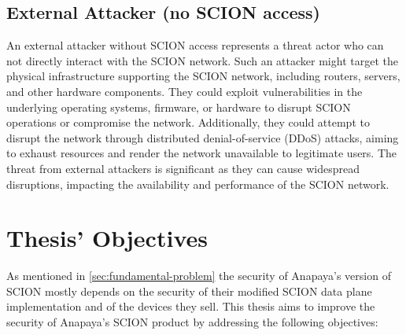 \subsection{External Attacker (no SCION access)}
An external attacker without SCION access represents a threat actor who can not directly interact with the SCION network.
Such an attacker might target the physical infrastructure supporting the SCION network, including routers, servers, and other hardware components.
They could exploit vulnerabilities in the underlying operating systems, firmware, or hardware to disrupt SCION operations or compromise the network.
Additionally, they could attempt to disrupt the network through distributed denial-of-service (DDoS) attacks, aiming to exhaust resources and render the network unavailable to legitimate users.
The threat from external attackers is significant as they can cause widespread disruptions, impacting the availability and performance of the SCION network.



\section{Thesis' Objectives}
As mentioned in \cref{sec:fundamental-problem} the security of Anapaya's version of SCION mostly depends on the security of their modified SCION data plane implementation and of the devices they sell.
This thesis aims to improve the security of Anapaya's SCION product by addressing the following objectives:

